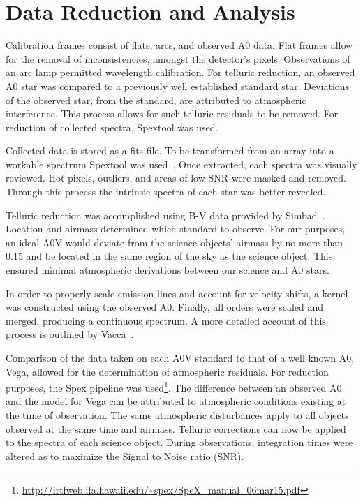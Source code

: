 \section{Data Reduction and Analysis}

Calibration frames consist of flats, arcs, and observed A0 data.  Flat frames allow for the removal of inconsistencies, amongst the detector's pixels.  Observations of an arc lamp permitted wavelength calibration.  For telluric reduction, an observed A0 star was compared to a previously well established standard star.  Deviations of the observed star, from the standard, are attributed to atmospheric interference.  This process allows for such telluric residuals to be removed.  For reduction of collected spectra, Spextool was used.



Collected data is stored as a fits file.  To be transformed from an array into a workable spectrum Spextool was used~\cite{Cushing_2004}.  Once extracted, each spectra was visually reviewed.  Hot pixels, outliers, and areas of low SNR were masked and removed.  Through this process the intrinsic spectra of each star was better revealed.



Telluric reduction was accomplished using B-V data provided by Simbad~\cite{simbad}.  
Location and airmass determined which standard to observe.  For our purposes, an ideal A0V would deviate from the science objects' airmass by no more than 0.15 and be located in the same region of the sky as the science object.  This ensured minimal atmospheric derivations between our science and A0 stars.

In order to properly scale emission lines and account for velocity shifts, a kernel was constructed using the observed A0.  Finally, all orders were scaled and merged, producing a continuous spectrum.
A more detailed account of this process is outlined by Vacca~\cite{Vacca_2003}. 



Comparison of the data taken on each A0V standard to that of a well known A0, Vega, allowed for the determination of atmospheric residuals.  %
For reduction purposes, the Spex pipeline was used\footnote{\url{http://irtfweb.ifa.hawaii.edu/~spex/SpeX_manual_06mar15.pdf}}.  The difference between an observed A0 and the model for Vega can be attributed to atmospheric conditions existing at the time of observation.  The same atmospheric disturbances apply to all objects observed at the same time and airmass.  Telluric corrections can now be applied to the spectra of each science object.  During observations, integration times were altered as to maximize the Signal to Noise ratio (SNR). \cite{Cushing_2004}
  
  
  



